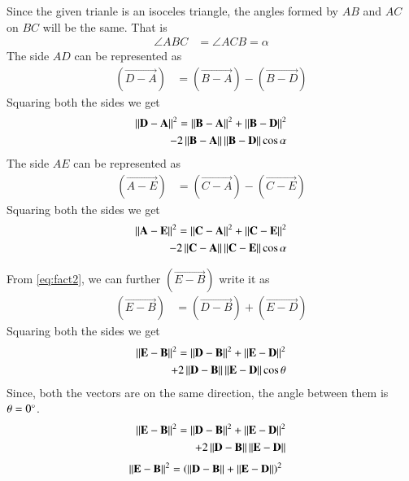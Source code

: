 \documentclass[journal,12pt,twocolumn]{IEEEtran}
\begin{document}
	Since the given trianle is an isoceles triangle, the angles formed by $AB$ and $AC$ on $BC$ will be the same. That is
	\begin{align}\label{eq:fact3}
		\angle ABC &= \angle ACB = \alpha
	\end{align}
	The side $AD$ can be represented as 
	\begin{align}\label{eq:eq1}
		(\vec{D-A}) &= (\vec{B-A}) - (\vec{B-D})
	\end{align}
	Squaring both the sides we get	
	\begin{align} \label{eq:eq2}
		\left\lVert\mathbf{D}-\mathbf{A}\right\rVert^{2} = \left\lVert\mathbf{B}-\mathbf{A}\right\rVert^{2} + \left\lVert\mathbf{B}-\mathbf{D}\right\rVert^{2} \nonumber \\ - 2\left\lVert\mathbf{B}-\mathbf{A}\right\rVert\left\lVert\mathbf{B}-\mathbf{D}\right\rVert\cos\alpha
	\end{align}
	The side $AE$ can be represented as 
	\begin{align}\label{eq:eq3}
		(\vec{A-E}) &= (\vec{C-A}) - (\vec{C-E})
	\end{align}
	Squaring both the sides we get	
	\begin{align} \label{eq:eq4}
		\left\lVert\mathbf{A}-\mathbf{E}\right\rVert^{2} = \left\lVert\mathbf{C}-\mathbf{A}\right\rVert^{2} + \left\lVert\mathbf{C}-\mathbf{E}\right\rVert^{2} \nonumber \\  - 2\left\lVert\mathbf{C}-\mathbf{A}\right\rVert\left\lVert\mathbf{C}-\mathbf{E}\right\rVert\cos\alpha
	\end{align}
	
	From \eqref{eq:fact2}, we can further $(\vec{E-B})$ write it as 
	\begin{align}\label{eq:eq5}
		(\vec{E-B}) &= (\vec{D-B}) + (\vec{E-D})
	\end{align}
	Squaring both the sides we get
	\begin{align} \label{eq:eq6}
		\left\lVert\mathbf{E}-\mathbf{B}\right\rVert^{2} = \left\lVert\mathbf{D}-\mathbf{B}\right\rVert^{2} + \left\lVert\mathbf{E}-\mathbf{D}\right\rVert^{2} \nonumber \\ + 2\left\lVert\mathbf{D}-\mathbf{B}\right\rVert\left\lVert\mathbf{E}-\mathbf{D}\right\rVert\cos\theta
	\end{align}
	Since, both the vectors are on the same direction, the angle between them is $\theta = 0\degree$.
	\begin{align} \label{eq:eq7}
		\left\lVert\mathbf{E}-\mathbf{B}\right\rVert^{2} = \left\lVert\mathbf{D}-\mathbf{B}\right\rVert^{2} + \left\lVert\mathbf{E}-\mathbf{D}\right\rVert^{2} \nonumber \\ + 2\left\lVert\mathbf{D}-\mathbf{B}\right\rVert\left\lVert\mathbf{E}-\mathbf{D}\right\rVert
	\end{align}
	\begin{align}\label{eq:eq8}
		\left\lVert\mathbf{E}-\mathbf{B}\right\rVert^{2} &= \left(\left\lVert\mathbf{D}-\mathbf{B}\right\rVert + \left\lVert\mathbf{E}-\mathbf{D}\right\rVert\right)^{2}
	\end{align}
\end{document}
